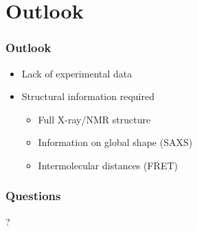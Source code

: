 \documentclass[english]{beamer}
\begin{document}

\section{Outlook}

\begin{frame}
    \frametitle{Outlook}


    \begin{itemize}
        \item<1-> Lack of experimental data
        \item<2-> Structural information required
            \begin{itemize}
                \item<2-> Full X-ray/NMR structure
                \item<2-> Information on global shape (SAXS)
                \item<2-> Intermolecular distances (FRET)
            \end{itemize}
    \end{itemize}


\end{frame}   


\begin{frame}
    \frametitle{Questions}

    \vfill
    \centering
    \Huge ?
    \vfill


\end{frame}   
 
\end{document}
